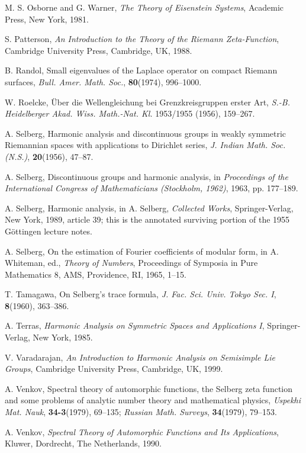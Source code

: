 \begin{enumerate}[label={[\arabic*]},leftmargin=2.8em,itemsep=0.35em,topsep=0.4em]
\item M. S. Osborne and G. Warner, \emph{The Theory of Eisenstein Systems}, Academic
Press, New York, 1981.
\item S. Patterson, \emph{An Introduction to the Theory of the Riemann
Zeta-Function}, Cambridge University Press, Cambridge, UK, 1988.
\item B. Randol, Small eigenvalues of the Laplace operator on compact Riemann surfaces,
\emph{Bull. Amer. Math. Soc.}, \textbf{80}(1974), 996--1000.
\item W. Roelcke, \"Uber die Wellengleichung bei Grenzkreisgruppen erster Art,
\emph{S.-B. Heidelberger Akad. Wiss. Math.-Nat. Kl.} 1953/1955 (1956), 159--267.
\item A. Selberg, Harmonic analysis and discontinuous groups in weakly symmetric
Riemannian spaces with applications to Dirichlet series, \emph{J. Indian Math. Soc.
(N.S.)}, \textbf{20}(1956), 47--87.
\item A. Selberg, Discontinuous groups and harmonic analysis, in \emph{Proceedings of
the International Congress of Mathematicians (Stockholm, 1962)}, 1963, pp. 177--189.
\item A. Selberg, Harmonic analysis, in A. Selberg, \emph{Collected Works},
Springer-Verlag, New York, 1989, article 39; this is the annotated surviving portion
of the 1955 G\"ottingen lecture notes.
\item A. Selberg, On the estimation of Fourier coefficients of modular form, in
A. Whiteman, ed., \emph{Theory of Numbers}, Proceedings of Symposia in Pure
Mathematics 8, AMS, Providence, RI, 1965, 1--15.
\item T. Tamagawa, On Selberg's trace formula, \emph{J. Fac. Sci. Univ. Tokyo Sec. I},
\textbf{8}(1960), 363--386.
\item A. Terras, \emph{Harmonic Analysis on Symmetric Spaces and Applications I},
Springer-Verlag, New York, 1985.
\item V. Varadarajan, \emph{An Introduction to Harmonic Analysis on Semisimple Lie
Groups}, Cambridge University Press, Cambridge, UK, 1999.
\item A. Venkov, Spectral theory of automorphic functions, the Selberg zeta function
and some problems of analytic number theory and mathematical physics, \emph{Uspekhi
Mat. Nauk}, \textbf{34-3}(1979), 69--135; \emph{Russian Math. Surveys},
\textbf{34}(1979), 79--153.
\item A. Venkov, \emph{Spectral Theory of Automorphic Functions and Its Applications},
Kluwer, Dordrecht, The Netherlands, 1990.

\end{enumerate}

